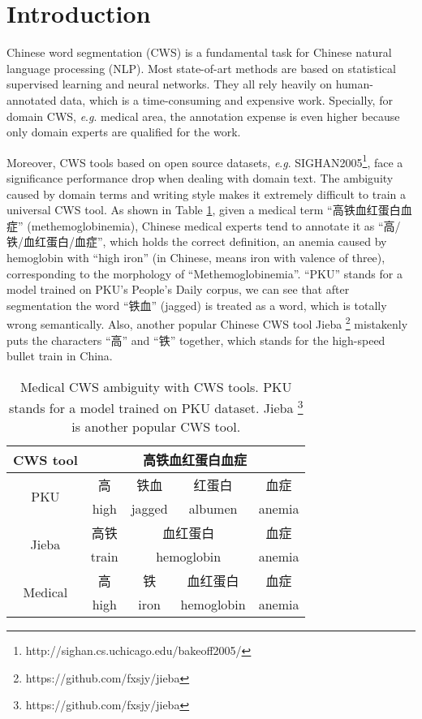 \section{Introduction} \label{sec:intro}

Chinese word segmentation (CWS) is a fundamental task for Chinese natural language processing (NLP). Most state-of-art methods are based on statistical supervised learning and neural networks. They all rely heavily on human-annotated data, which is a time-consuming and expensive work. Specially, for domain CWS, \textit{e}.\textit{g}. medical area, the annotation expense is even higher because only domain experts are qualified for the work. 

Moreover, CWS tools based on open source datasets, \textit{e}.\textit{g}. SIGHAN2005\footnote{http://sighan.cs.uchicago.edu/bakeoff2005/}, face a significance performance drop when dealing with domain text. The ambiguity caused by domain terms and writing style makes it extremely difficult to train a universal CWS tool. As shown in Table \ref{table:1}, given a medical term “高铁血红蛋白血症” (methemoglobinemia), Chinese medical experts tend to annotate it as “高/铁/血红蛋白/血症”, which holds the correct definition, an anemia caused by hemoglobin with ``high iron'' (in Chinese, means iron with valence of three), corresponding to the morphology of ``Methemoglobinemia''. ``PKU'' stands for a model trained on PKU's People's Daily corpus, we can see that after segmentation the word ``铁血'' (jagged) is treated as a word, which is totally wrong semantically. Also, another popular Chinese CWS tool Jieba \footnote{https://github.com/fxsjy/jieba}
mistakenly puts the characters ``高'' and ``铁'' together, which stands for the high-speed bullet train in China.

\begin{table}[t!]
\centering
\begin{adjustbox}{width=7.7cm}
\begin{tabular}{|c|c|c|c|c|}
\hline
{\bf CWS tool} & \multicolumn{4}{c|}{\bf 高铁血红蛋白血症} \\
\hline
\multirow{2}{*}{PKU} & 高 & 铁血 & 红蛋白 & 血症 \\ & high & jagged & albumen & anemia\\
\hline
\multirow{2}{*}{Jieba} & 高铁 & \multicolumn{2}{c|}{血红蛋白}  & 血症 \\ & train & \multicolumn{2}{c|}{hemoglobin} & anemia\\
\hline
\multirow{2}{*}{Medical} & 高 & 铁 & 血红蛋白  & 血症 \\ & high & iron & hemoglobin & anemia\\
\hline
\end{tabular}
\end{adjustbox}
\caption{Medical CWS ambiguity with CWS tools. PKU stands for a model trained on PKU dataset. Jieba \footnote{https://github.com/fxsjy/jieba} is another
popular CWS tool.}\label{table:1}
\end{table}

